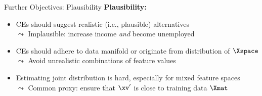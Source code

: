 \documentclass[11pt,compress,t,notes=noshow, aspectratio=169, xcolor=table, usenames,dvipsnames]{beamer}
\begin{document}
\begin{frame}{Further Objectives: Plausibility}
		\textbf{Plausibility:}
		\begin{itemize}
			\item<1-> CEs should suggest realistic (i.e., plausible) alternatives\\
			$\leadsto$ Implausible: increase income \emph{and} become unemployed
			\item<2-> CEs should adhere to data manifold or originate from distribution of $\Xspace$\\
			$\leadsto$ Avoid unrealistic combinations of feature values
			\item<3-> Estimating joint distribution is hard, especially for mixed feature spaces\\
			$\leadsto$ Common proxy: ensure that $\xv'$ is close to training data $\Xmat$
		\end{itemize}	
\end{frame}
\end{document}
